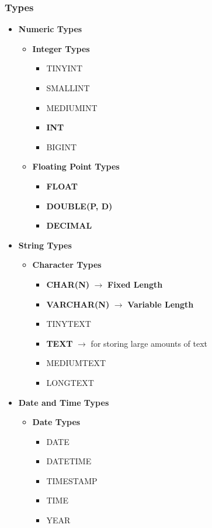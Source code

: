 \documentclass{article}
\begin{document}
\subsubsection*{Types}
\begin{itemize}
    \item \textbf{Numeric Types}
    \begin{itemize}
        \item \textbf{Integer Types}
        \begin{itemize}
            \item TINYINT
            \item SMALLINT
            \item MEDIUMINT
            \item \textbf{INT}
            \item BIGINT
        \end{itemize}
        \item \textbf{Floating Point Types}
        \begin{itemize}
            \item \textbf{FLOAT}
            \item \textbf{DOUBLE(P, D)}
            \item \textbf{DECIMAL}
        \end{itemize}
    \end{itemize}
    \item \textbf{String Types}
    \begin{itemize}
        \item \textbf{Character Types}
        \begin{itemize}
            \item \textbf{CHAR(N)} $\longrightarrow$ \textbf{Fixed Length}
            \item \textbf{VARCHAR(N)} $\longrightarrow$ \textbf{Variable Length}
            \item TINYTEXT
            \item \textbf{TEXT} $\longrightarrow$ for storing large amounts of 
            text
            \item MEDIUMTEXT
            \item LONGTEXT
        \end{itemize}
    \end{itemize}
    \item \textbf{Date and Time Types}
    \begin{itemize}
        \item \textbf{Date Types}
        \begin{itemize}
            \item DATE
            \item DATETIME
            \item TIMESTAMP
            \item TIME
            \item YEAR
        \end{itemize}
    \end{itemize}
\end{itemize}
\end{document}
